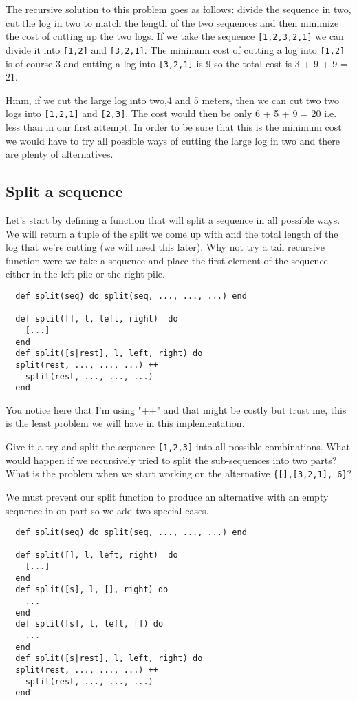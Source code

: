 \documentclass[a4paper,11pt]{article}
\begin{document}
The recursive solution to this problem goes as follows: divide the
sequence in two, cut the log in two to match the length of the two
sequences and then minimize the cost of cutting up the two logs. If we
take the sequence {\tt [1,2,3,2,1]} we can divide it into {\tt [1,2]}
and {\tt [3,2,1]}. The minimum cost of cutting a log into {\tt [1,2]}
is of course 3 and cutting a log into {\tt [3,2,1]} is 9 so the total
cost is 3 + 9 + 9 = 21.

Hmm, if we cut the large log into two,4 and 5 meters, then we can cut
two two logs into {\tt [1,2,1]} and {\tt [2,3]}. The cost would then
be only 6 + 5 + 9 = 20 i.e. less than in our first attempt. In order
to be sure that this is the minimum cost we would have to try all
possible ways of cutting the large log in two and there are plenty of
alternatives.

\subsection{Split a sequence}

Let's start by defining a function that will split a sequence in all
possible ways. We will return a tuple of the split we come up with and
the total length of the log that we're cutting (we will need this
later). Why not try a tail recursive function were we take a sequence
and place the first element of the sequence either in the left pile or
the right pile.

\begin{verbatim}
  def split(seq) do split(seq, ..., ..., ...) end

  def split([], l, left, right)  do
    [...]
  end
  def split([s|rest], l, left, right) do
  split(rest, ..., ..., ...) ++
    split(rest, ..., ..., ...)
  end
\end{verbatim}

You notice here that I'm using "++" and that might be costly but trust
me, this is the least problem we will have in this implementation.

Give it a try and split the sequence {\tt [1,2,3]} into all possible
combinations. What would happen if we recursively tried to split the
sub-sequences into two parts? What is the problem when we start working
on the alternative {\tt\{[],[3,2,1], 6\}}?

We must prevent our split function to produce an alternative with an
empty sequence in on part so we add two special cases.

\begin{verbatim}
  def split(seq) do split(seq, ..., ..., ...) end

  def split([], l, left, right)  do
    [...]
  end
  def split([s], l, [], right) do
    ...
  end
  def split([s], l, left, []) do
    ...
  end
  def split([s|rest], l, left, right) do
  split(rest, ..., ..., ...) ++
    split(rest, ..., ..., ...)
  end
\end{verbatim}
\end{document}
